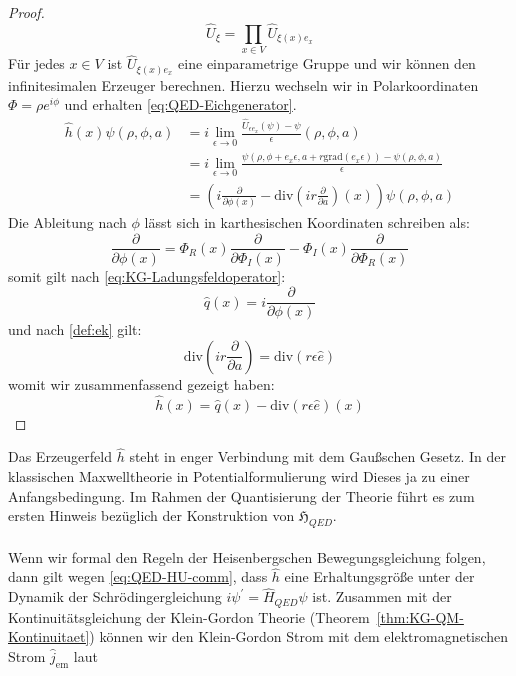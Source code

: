 \documentclass[11pt,a4paper,leqno]{report}
\numberwithin{equation}{chapter}
\begin{document}
\begin{proof}
\begin{equation*}
	\hat{U}_\xi = \prod_{x\in V}\hat{U}_{\xi(x)e_x}
\end{equation*}
F\"ur jedes $x\in V$ ist $\hat{U}_{\xi(x)e_x}$ eine einparametrige Gruppe und wir k\"onnen den infinitesimalen Erzeuger berechnen. Hierzu wechseln wir in Polarkoordinaten $\Phi=\rho e^{i\phi}$ und erhalten \eqref{eq:QED-Eichgenerator}. 
\begin{align*}
	\hat{h}(x)\psi(\rho, \phi, a) &=i\lim_{\epsilon\rightarrow 0}\frac{\hat{U}_{\epsilon e_x}(\psi)-\psi}{\epsilon}(\rho, \phi, a) \\
	&=i\lim_{\epsilon\rightarrow 0}\frac{\psi(\rho, \phi + e_x \epsilon, a + r \text{grad}(e_x \epsilon))-\psi(\rho, \phi, a)}{\epsilon} \\
	&=(i\frac{\partial}{\partial\phi(x)}-\text{div}(ir\frac{\partial}{\partial a})(x))\psi(\rho, \phi, a)
\end{align*}
Die Ableitung nach $\phi$ l\"asst sich in karthesischen Koordinaten schreiben als:
\begin{equation*}
	\frac{\partial}{\partial\phi(x)}=\Phi_{R}(x)\frac{\partial}{\partial \Phi_I(x)}-\Phi_{I}(x)\frac{\partial}{\partial \Phi_R(x)}
\end{equation*}
somit gilt nach \eqref{eq:KG-Ladungsfeldoperator}:
\begin{equation*}
	\hat{q}(x)=i\frac{\partial}{\partial\phi(x)}
\end{equation*}
und nach \eqref{def:ek}  gilt:
\begin{equation*}
	\text{div}(ir\frac{\partial}{\partial a}) = \text{div}(r\epsilon \hat{e})
\end{equation*}
womit wir zusammenfassend gezeigt haben:
\begin{equation*}
\hat{h}(x) = \hat{q}(x) - \text{div}(r\epsilon \hat{e})(x)
\end{equation*}

\end{proof}
\noindent
Das Erzeugerfeld $\hat{h}$ steht in enger Verbindung mit dem Gau\ss{}schen Gesetz. In der klassischen Maxwelltheorie in Potentialformulierung wird Dieses ja zu einer Anfangsbedingung. Im Rahmen der Quantisierung der Theorie f\"uhrt es zum ersten Hinweis bez\"uglich der Konstruktion von $\mathfrak{H}_{QED}$. \\
\\
Wenn wir formal den Regeln der Heisenbergschen Bewegungsgleichung folgen, dann gilt wegen \eqref{eq:QED-HU-comm}, dass $\hat{h}$ eine Erhaltungsgr\"o\ss{}e unter der Dynamik der Schr\"odingergleichung $i\psi^\prime=\hat{H}_{QED}\psi$ ist. Zusammen mit der Kontinuit\"atsgleichung der Klein-Gordon Theorie (Theorem~\ref{thm:KG-QM-Kontinuitaet}) k\"onnen wir den Klein-Gordon Strom mit dem elektromagnetischen Strom $\hat{j}_{\text{em}}$ laut 
\end{document}
